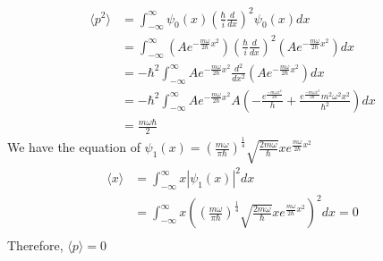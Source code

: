 \documentclass{article}
\begin{document}
\begin{align*}
	\langle p^2 \rangle & = \int_{-\infty}^{\infty} \psi_0(x) \left(\frac{\hbar}{i} \frac{d}{dx}\right)^2 \psi_0(x) dx                                                                                                          \\
	                    & = \int_{-\infty}^{\infty} (A e^{-\frac{m \omega}{2\hbar}x^2}) \left(\frac{\hbar}{i} \frac{d}{dx}\right)^2 (A e^{-\frac{m \omega}{2\hbar}x^2}) dx                                                      \\
	                    & = -\hbar^2 \int_{-\infty}^{\infty} A e^{-\frac{m \omega}{2\hbar}x^2} \frac{d^2}{dx^2} (A e^{-\frac{m \omega}{2\hbar}x^2}) dx                                                                          \\
	                    & = -\hbar^2 \int_{-\infty}^{\infty} A e^{-\frac{m \omega}{2\hbar}x^2} A \left(-\frac{e^{\frac{-m \omega x^2}{2\hbar}}}{h} + \frac{e^{\frac{-m \omega x^2}{2\hbar}}m^2 \omega^2 x^2}{\hbar^2}\right) dx \\
	                    & = \frac{m \omega \hbar}{2}
\end{align*}
\noindent We have the equation of \(\psi_1(x) = \left(\frac{m \omega}{\pi \hbar}\right)^{\frac{1}{4}} \sqrt{\frac{2m\omega}{\hbar}}xe^{\frac{m\omega}{2\hbar}x^2}\)
\begin{align*}
	\langle x \rangle & = \int_{-\infty}^{\infty} x |\psi_1(x)|^2 dx                                                                                                                        \\
	                  & = \int_{-\infty}^{\infty} x \left(\left(\frac{m \omega}{\pi \hbar}\right)^{\frac{1}{4}} \sqrt{\frac{2m\omega}{\hbar}}xe^{\frac{m\omega}{2\hbar}x^2}\right)^2 dx = 0 \\
\end{align*}
Therefore, \(\langle p \rangle = 0\)
\end{document}
